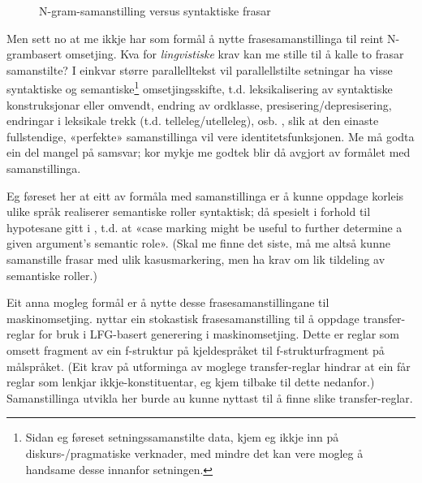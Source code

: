 \documentclass[11pt,a4paper,oneside,draft]{book}
\begin{document}
  \begin{figure}[htp]
    \vfill{} %
   \caption{N-gram-samanstilling versus syntaktiske frasar}
    \label{fig:ikkjenode}
  \end{figure}

Men sett no at me ikkje har som formål å nytte frasesamanstillinga til
reint N-grambasert omsetjing. Kva for \emph{lingvistiske} krav kan me stille
til å kalle to frasar samanstilte? I einkvar større parallelltekst vil
parallellstilte setningar ha visse syntaktiske og semantiske\footnote{Sidan eg føreset setningssamanstilte data, kjem eg ikkje inn på
 diskurs-/pragmatiske verknader, med mindre det kan vere mogleg
 å handsame desse innanfor setningen. }
omsetjingsskifte, t.d. leksikalisering av syntaktiske konstruksjonar
eller omvendt, endring av ordklasse, presisering/depresisering,
endringar i leksikale trekk (t.d. telleleg/utelleleg),
osb. \citep[s.~56--62]{munday2001its}, slik at den einaste
fullstendige, «perfekte» samanstillinga vil vere
identitetsfunksjonen. Me må godta ein del mangel på samsvar; kor mykje
me godtek blir då avgjort av formålet med samanstillinga.

Eg føreset her at eitt av formåla med samanstillinga er å kunne
oppdage korleis ulike språk realiserer semantiske roller syntaktisk;
då spesielt i forhold til hypotesane gitt i \citet[s.~7]{xpar2008rcn},
t.d. at «case marking might be useful to further determine a given
argument's semantic role». (Skal me finne det siste, må me altså kunne
samanstille frasar med ulik kasusmarkering, men ha krav om lik
tildeling av semantiske roller.)

Eit anna mogleg formål er å nytte desse frasesamanstillingane til
maskinomsetjing. \citet{riezler2006gmt} nyttar ein stokastisk
frasesamanstilling til å oppdage transfer-reglar for bruk i LFG-basert
generering i maskinomsetjing. Dette er reglar som omsett fragment av
ein f-struktur på kjeldespråket til f-strukturfragment på
målspråket. (Eit krav på utforminga av moglege transfer-reglar hindrar
at ein får reglar som lenkjar ikkje-konstituentar, eg kjem tilbake til
dette nedanfor.)  Samanstillinga utvikla her burde au kunne nyttast
til å finne slike transfer-reglar.
\end{document}

